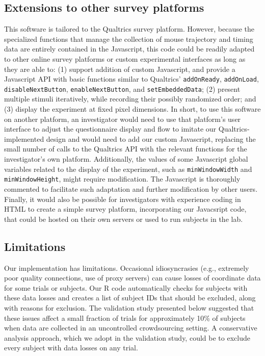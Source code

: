 \documentclass[]{article}
\begin{document}
\subsection{Extensions to other survey platforms}

This software is tailored to the Qualtrics survey platform. However,
because the specialized functions that manage the collection of mouse
trajectory and timing data are entirely contained in the Javascript,
this code could be readily adapted to other online survey platforms or
custom experimental interfaces as long as they are able to: (1) support
addition of custom Javascript, and provide a Javascript API with basic
functions similar to Qualtrics' \texttt{addOnReady}, \texttt{addOnLoad},
\texttt{disableNextButton}, \texttt{enableNextButton}, and
\texttt{setEmbeddedData}; (2) present multiple stimuli iteratively,
while recording their possibly randomized order; and (3) display the
experiment at fixed pixel dimensions. In short, to use this software on
another platform, an investigator would need to use that platform's user
interface to adjust the questionnaire display and flow to imitate our
Qualtrics-implemented design and would need to add our custom
Javascript, replacing the small number of calls to the Qualtrics API
with the relevant functions for the investigator's own platform.
Additionally, the values of some Javascript global variables related to
the display of the experiment, such as \texttt{minWindowWidth} and
\texttt{minWindowHeight}, might require modification. The Javascript is
thoroughly commented to facilitate such adaptation and further
modification by other users. Finally, it would also be possible for
investigators with experience coding in HTML to create a simple survey
platform, incorporating our Javacsript code, that could be hosted on
their own servers or used to run subjects in the lab.

\subsection{Limitations}

Our implementation has limitations. Occasional idiosyncrasies (e.g.,
extremely poor quality connections, use of proxy servers) can cause
losses of coordinate data for some trials or subjects. Our R code
automatically checks for subjects with these data losses and creates a
list of subject IDs that should be excluded, along with reasons for
exclusion. The validation study presented below suggested that these
issues affect a small fraction of trials for approximately 10\% of
subjects when data are collected in an uncontrolled crowdsourcing
setting. A conservative analysis approach, which we adopt in the
validation study, could be to exclude every subject with data losses on
any trial.
\end{document}
